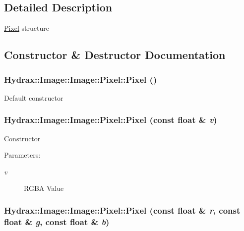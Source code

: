 \subsection{Detailed Description}
\hyperlink{struct_hydrax_1_1_image_1_1_pixel}{Pixel} structure 

\subsection{Constructor \& Destructor Documentation}
\hypertarget{struct_hydrax_1_1_image_1_1_pixel_7bce5f29e8725b3da2102c9d48236fa2}{
\subsubsection[{Pixel}]{\setlength{\rightskip}{0pt plus 5cm}Hydrax::Image::Image::Pixel::Pixel ()}}
\label{struct_hydrax_1_1_image_1_1_pixel_7bce5f29e8725b3da2102c9d48236fa2}


Default constructor \hypertarget{struct_hydrax_1_1_image_1_1_pixel_eb126e432cef9cba4fdbf34c6b445833}{
\subsubsection[{Pixel}]{\setlength{\rightskip}{0pt plus 5cm}Hydrax::Image::Image::Pixel::Pixel (const float \& {\em v})}}
\label{struct_hydrax_1_1_image_1_1_pixel_eb126e432cef9cba4fdbf34c6b445833}


Constructor \begin{Desc}
\item[Parameters:]
\begin{description}
\item[{\em v}]RGBA Value \end{description}
\end{Desc}
\hypertarget{struct_hydrax_1_1_image_1_1_pixel_c6035417ad647ad57c275f462b8cfab9}{
\subsubsection[{Pixel}]{\setlength{\rightskip}{0pt plus 5cm}Hydrax::Image::Image::Pixel::Pixel (const float \& {\em r}, \/  const float \& {\em g}, \/  const float \& {\em b})}}
\label{struct_hydrax_1_1_image_1_1_pixel_c6035417ad647ad57c275f462b8cfab9}


